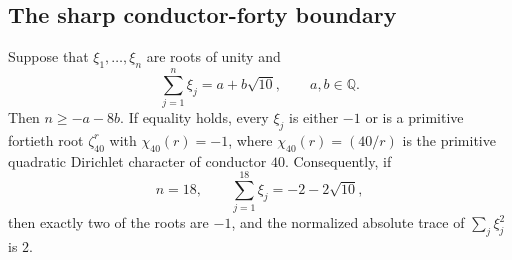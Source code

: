 \subsection{The sharp conductor-forty boundary}
\begin{lemma}\label{lem:rootlength40}
Suppose that $\xi_1,\ldots,\xi_n$ are roots of unity and
\[
 \sum_{j=1}^n\xi_j=a+b\sqrt{10},\qquad a,b\in\mathbb Q.
\]
Then $n\geq -a-8b$. If equality holds, every $\xi_j$ is either $-1$ or
is a primitive fortieth root $\zeta_{40}^{r}$ with
$\chi_{40}(r)=-1$, where $\chi_{40}(r)=(40/r)$ is the primitive quadratic
Dirichlet character of conductor $40$.
Consequently, if
\[
 n=18,\qquad\sum_{j=1}^{18}\xi_j=-2-2\sqrt{10},
\]
then exactly two of the roots are $-1$, and the normalized absolute trace of
$\sum_j\xi_j^2$ is $2$.
\end{lemma}

